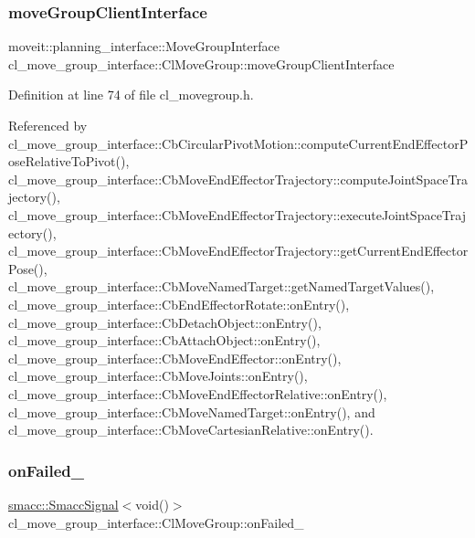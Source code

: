 \subsubsection{\texorpdfstring{move\+Group\+Client\+Interface}{moveGroupClientInterface}}
{\footnotesize\ttfamily moveit\+::planning\+\_\+interface\+::\+Move\+Group\+Interface cl\+\_\+move\+\_\+group\+\_\+interface\+::\+Cl\+Move\+Group\+::move\+Group\+Client\+Interface}



Definition at line 74 of file cl\+\_\+movegroup.\+h.



Referenced by cl\+\_\+move\+\_\+group\+\_\+interface\+::\+Cb\+Circular\+Pivot\+Motion\+::compute\+Current\+End\+Effector\+Pose\+Relative\+To\+Pivot(), cl\+\_\+move\+\_\+group\+\_\+interface\+::\+Cb\+Move\+End\+Effector\+Trajectory\+::compute\+Joint\+Space\+Trajectory(), cl\+\_\+move\+\_\+group\+\_\+interface\+::\+Cb\+Move\+End\+Effector\+Trajectory\+::execute\+Joint\+Space\+Trajectory(), cl\+\_\+move\+\_\+group\+\_\+interface\+::\+Cb\+Move\+End\+Effector\+Trajectory\+::get\+Current\+End\+Effector\+Pose(), cl\+\_\+move\+\_\+group\+\_\+interface\+::\+Cb\+Move\+Named\+Target\+::get\+Named\+Target\+Values(), cl\+\_\+move\+\_\+group\+\_\+interface\+::\+Cb\+End\+Effector\+Rotate\+::on\+Entry(), cl\+\_\+move\+\_\+group\+\_\+interface\+::\+Cb\+Detach\+Object\+::on\+Entry(), cl\+\_\+move\+\_\+group\+\_\+interface\+::\+Cb\+Attach\+Object\+::on\+Entry(), cl\+\_\+move\+\_\+group\+\_\+interface\+::\+Cb\+Move\+End\+Effector\+::on\+Entry(), cl\+\_\+move\+\_\+group\+\_\+interface\+::\+Cb\+Move\+Joints\+::on\+Entry(), cl\+\_\+move\+\_\+group\+\_\+interface\+::\+Cb\+Move\+End\+Effector\+Relative\+::on\+Entry(), cl\+\_\+move\+\_\+group\+\_\+interface\+::\+Cb\+Move\+Named\+Target\+::on\+Entry(), and cl\+\_\+move\+\_\+group\+\_\+interface\+::\+Cb\+Move\+Cartesian\+Relative\+::on\+Entry().

\mbox{\label{classcl__move__group__interface_1_1ClMoveGroup_a3e0ea6acf70a0c527864b712b215033b}} 
\subsubsection{\texorpdfstring{on\+Failed\+\_\+}{onFailed\_}}
{\footnotesize\ttfamily \hyperlink{classsmacc_1_1SmaccSignal}{smacc\+::\+Smacc\+Signal}$<$void()$>$ cl\+\_\+move\+\_\+group\+\_\+interface\+::\+Cl\+Move\+Group\+::on\+Failed\+\_\+\hspace{0.3cm}{\ttfamily [private]}}



